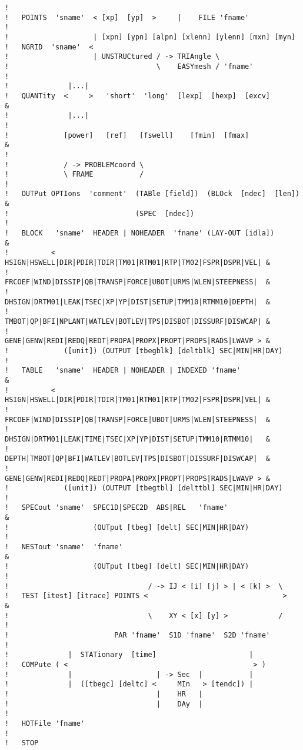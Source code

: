 \documentclass[12pt]{book}
\begin{document}
\begin{verbatim}
!
!   POINTS  'sname'  < [xp]  [yp]  >     |    FILE 'fname'
!
!                    | [xpn] [ypn] [alpn] [xlenn] [ylenn] [mxn] [myn]
!   NGRID  'sname'  <
!                    | UNSTRUCtured / -> TRIAngle \
!                                   \    EASYmesh / 'fname'
!
!              |...|
!   QUANTity  <     >   'short'  'long'  [lexp]  [hexp]  [excv]             &
!              |...|
!
!             [power]   [ref]   [fswell]    [fmin]  [fmax]                  &
!
!             / -> PROBLEMcoord \
!             \ FRAME           /
!
!   OUTPut OPTIons  'comment'  (TABle [field])  (BLOck  [ndec]  [len])      &
!                              (SPEC  [ndec])
!
!   BLOCK   'sname'  HEADER | NOHEADER  'fname' (LAY-OUT [idla])            &
!          <  HSIGN|HSWELL|DIR|PDIR|TDIR|TM01|RTM01|RTP|TM02|FSPR|DSPR|VEL| &
!             FRCOEF|WIND|DISSIP|QB|TRANSP|FORCE|UBOT|URMS|WLEN|STEEPNESS|  &
!             DHSIGN|DRTM01|LEAK|TSEC|XP|YP|DIST|SETUP|TMM10|RTMM10|DEPTH|  &
!             TMBOT|QP|BFI|NPLANT|WATLEV|BOTLEV|TPS|DISBOT|DISSURF|DISWCAP| &
!             GENE|GENW|REDI|REDQ|REDT|PROPA|PROPX|PROPT|PROPS|RADS|LWAVP > &
!             ([unit]) (OUTPUT [tbegblk] [deltblk] SEC|MIN|HR|DAY)
!
!   TABLE   'sname'  HEADER | NOHEADER | INDEXED 'fname'                    &
!          <  HSIGN|HSWELL|DIR|PDIR|TDIR|TM01|RTM01|RTP|TM02|FSPR|DSPR|VEL| &
!             FRCOEF|WIND|DISSIP|QB|TRANSP|FORCE|UBOT|URMS|WLEN|STEEPNESS|  &
!             DHSIGN|DRTM01|LEAK|TIME|TSEC|XP|YP|DIST|SETUP|TMM10|RTMM10|   &
!             DEPTH|TMBOT|QP|BFI|WATLEV|BOTLEV|TPS|DISBOT|DISSURF|DISWCAP|  &
!             GENE|GENW|REDI|REDQ|REDT|PROPA|PROPX|PROPT|PROPS|RADS|LWAVP > &
!             ([unit]) (OUTPUT [tbegtbl] [delttbl] SEC|MIN|HR|DAY)
!
!   SPECout 'sname'  SPEC1D|SPEC2D  ABS|REL   'fname'                       &
!                    (OUTput [tbeg] [delt] SEC|MIN|HR|DAY)
!
!   NESTout 'sname'  'fname'                                                &
!                    (OUTput [tbeg] [delt] SEC|MIN|HR|DAY)
!
!                                 / -> IJ < [i] [j] > | < [k] >  \
!   TEST [itest] [itrace] POINTS <                                >         &
!                                 \    XY < [x] [y] >            /
!
!                         PAR 'fname'  S1D 'fname'  S2D 'fname'
!
!              |  STATionary  [time]                      |
!   COMPute ( <                                            > )
!              |                    | -> Sec  |           |
!              |  ([tbegc] [deltc] <     MIn   > [tendc]) |
!                                   |    HR   |
!                                   |    DAy  |
!
!   HOTFile 'fname'
!
!   STOP
\end{verbatim}
\end{document}
